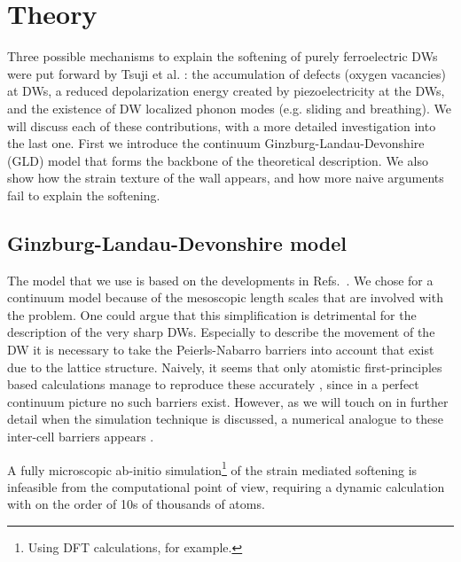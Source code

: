 \section{Theory}
Three possible mechanisms to explain the softening of purely ferroelectric DWs were put forward by Tsuji et al. \cite{Tsuji2005}: the accumulation of defects (oxygen vacancies) at DWs, a reduced depolarization energy created by piezoelectricity at the DWs, and the existence of DW localized phonon modes (e.g. sliding and breathing). We will discuss each of these contributions, with a more detailed investigation into the last one.
First we introduce the continuum Ginzburg-Landau-Devonshire (GLD) model that forms the backbone of the theoretical description.
We also show how the strain texture of the wall appears, and how more naive arguments fail to explain the softening.

\subsection{Ginzburg-Landau-Devonshire model}
The model that we use is based on the developments in Refs.~\cite{Zhirnov1959,L.N.Bulaevskii1963,Marton2010}.
We chose for a continuum model because of the mesoscopic length scales that are involved with the problem.
One could argue that this simplification is detrimental for the description of the very sharp DWs.
Especially to describe the movement of the DW it is necessary to take the Peierls-Nabarro barriers into account that exist due to the lattice structure.
Naively, it seems that only atomistic first-principles based calculations manage to reproduce these accurately \cite{Meyer2002}, since in a perfect continuum picture no such barriers exist.
However, as we will touch on in further detail when the simulation technique is discussed, a numerical analogue to these inter-cell barriers appears \cite{Marton2018}.

A fully microscopic ab-initio simulation\footnote{Using DFT calculations, for example.} of the strain mediated softening is infeasible from the computational point of view, requiring a dynamic calculation with on the order of 10s of thousands of atoms.

